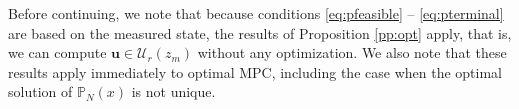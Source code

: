 \documentclass{article}
\begin{document}
Before continuing, we note that because conditions \eqref{eq:pfeasible} -- \eqref{eq:pterminal} are based on the
measured state, the results of Proposition \ref{pp:opt} apply, that is, we can compute $\mathbf{u} \in \mathcal{U}_r(z_m)$ without any optimization.
We also note that these results apply immediately to optimal MPC, including the
case when the optimal solution of $\mathbb{P}_N(x)$ is not unique.

\begin{comment}


\section{Robust stability in the absence of state constraints}
\label{sec:nostateconstraints}
One method to increase the region of attraction of the origin under process
disturbances is to replace the hard state constraints $x(k) \in \mathbb{X}$
with penalties, thus allowing small state constraint violations. In this 
section we also replace the terminal constraint by adjusting the
terminal penalty by weighting it, $\beta V_f(x(N))$. Unlike the case of 
general state constraints,  however, this does not expand the region of
attraction of the origin because the terminal constraint must still be
exactly satisfied to use the local controller $\kappa_f(x)$ at the end of 
the horizon. When considering the case of no terminal constraints we must
therefore restrict attention to states under which the MPC solution
a priori satisfies the the terminal constraint.


\end{comment}
\end{document}
